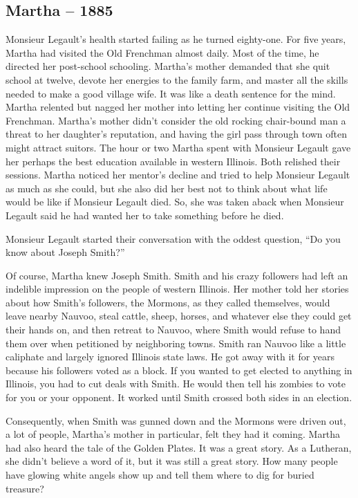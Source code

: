 \hypertarget{martha-1885}{%
\subsection*{Martha -- 1885}\label{martha-1885}}

Monsieur Legault's health started failing as he turned eighty-one. For
five years, Martha had visited the Old Frenchman almost daily. Most of
the time, he directed her post-school schooling. Martha's mother
demanded that she quit school at twelve, devote her energies to the
family farm, and master all the skills needed to make a good village
wife. It was like a death sentence for the mind. Martha relented but
nagged her mother into letting her continue visiting the Old Frenchman.
Martha's mother didn't consider the old rocking chair-bound man a threat
to her daughter's reputation, and having the girl pass through town
often might attract suitors. The hour or two Martha spent with Monsieur
Legault gave her perhaps the best education available in western
Illinois. Both relished their sessions. Martha noticed her mentor's
decline and tried to help Monsieur Legault as much as she could, but she
also did her best not to think about what life would be like if Monsieur
Legault died. So, she was taken aback when Monsieur Legault said he had
wanted her to take something before he died.

Monsieur Legault started their conversation with the oddest question,
``Do you know about Joseph Smith?''

Of course, Martha knew Joseph Smith. Smith and his crazy followers had
left an indelible impression on the people of western Illinois. Her
mother told her stories about how Smith's followers, the Mormons, as
they called themselves, would leave nearby Nauvoo, steal cattle, sheep,
horses, and whatever else they could get their hands on, and then
retreat to Nauvoo, where Smith would refuse to hand them over when
petitioned by neighboring towns. Smith ran Nauvoo like a little
caliphate and largely ignored Illinois state laws. He got away with it
for years because his followers voted as a block. If you wanted to get
elected to anything in Illinois, you had to cut deals with Smith. He
would then tell his zombies to vote for you or your opponent. It worked
until Smith crossed both sides in an election.

Consequently, when Smith was gunned down and the Mormons were driven
out, a lot of people, Martha's mother in particular, felt they had it
coming. Martha had also heard the tale of the Golden Plates. It was a
great story. As a Lutheran, she didn't believe a word of it, but it was
still a great story. How many people have glowing white angels show up
and tell them where to dig for buried treasure?

